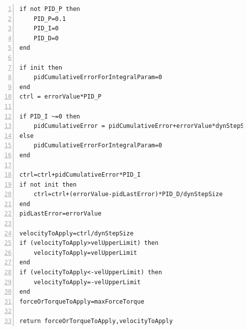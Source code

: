 \begin{lstlisting}[language={[5.0]Lua}, numbers = left, tabsize = 4, frame=single,breaklines, keywordstyle=\color{blue}, float, caption={Control code of the servo}, label={lst:servo}, captionpos = b]
if not PID_P then
    PID_P=0.1
    PID_I=0
    PID_D=0
end

if init then
    pidCumulativeErrorForIntegralParam=0
end
ctrl = errorValue*PID_P

if PID_I ~=0 then
    pidCumulativeError = pidCumulativeError+errorValue*dynStepSize
else
    pidCumulativeErrorForIntegralParam=0
end

ctrl=ctrl+pidCumulativeError*PID_I
if not init then
    ctrl=ctrl+(errorValue-pidLastError)*PID_D/dynStepSize
end
pidLastError=errorValue

velocityToApply=ctrl/dynStepSize
if (velocityToApply>velUpperLimit) then
    velocityToApply=velUpperLimit
end
if (velocityToApply<-velUpperLimit) then
    velocityToApply=-velUpperLimit
end
forceOrTorqueToApply=maxForceTorque

return forceOrTorqueToApply,velocityToApply
\end{lstlisting}
